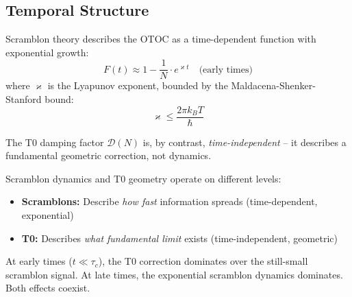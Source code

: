 \subsection{Temporal Structure}

Scramblon theory describes the OTOC as a time-dependent function with exponential growth:
\begin{equation}
	F(t) \approx 1 - \frac{1}{N} \cdot e^{\varkappa t} \quad \text{(early times)}
	\label{eq:otoc_scrambling}
\end{equation}
where $\varkappa$ is the Lyapunov exponent, bounded by the Maldacena-Shenker-Stanford bound:
\begin{equation}
	\varkappa \leq \frac{2\pi k_B T}{\hbar}
\end{equation}

The T0 damping factor $\mathcal{D}(N)$ is, by contrast, \emph{time-independent} -- it describes a fundamental geometric correction, not dynamics.

\begin{table}[h]
	\centering
	\caption{Time comparison: scramblon OTOC decay vs.\ static T0 correction ($N=16$, $\varkappa \cdot \tau_c \approx 1$)}
	\label{tab:time_comparison}
\end{table}

\begin{remark}[Complementarity]
	Scramblon dynamics and T0 geometry operate on different levels:
	\begin{itemize}
		\item \textbf{Scramblons:} Describe \emph{how fast} information spreads (time-dependent, exponential)
		\item \textbf{T0:} Describes \emph{what fundamental limit} exists (time-independent, geometric)
	\end{itemize}
	At early times ($t \ll \tau_c$), the T0 correction dominates over the still-small scramblon signal. At late times, the exponential scramblon dynamics dominates. Both effects coexist.
\end{remark}

